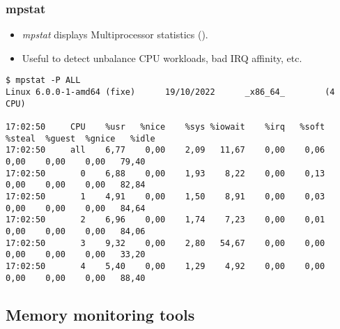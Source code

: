 \begin{frame}[fragile]
  \frametitle{mpstat}
  \begin{itemize}
    \item {\em mpstat} displays Multiprocessor statistics ().
    \item Useful to detect unbalance CPU workloads, bad IRQ affinity, etc.
  \end{itemize}
  \begin{block}{}
    \begin{verbatim}
$ mpstat -P ALL 
Linux 6.0.0-1-amd64 (fixe)      19/10/2022      _x86_64_        (4 CPU)

17:02:50     CPU    %usr   %nice    %sys %iowait    %irq   %soft  %steal  %guest  %gnice   %idle
17:02:50     all    6,77    0,00    2,09   11,67    0,00    0,06    0,00    0,00    0,00   79,40
17:02:50       0    6,88    0,00    1,93    8,22    0,00    0,13    0,00    0,00    0,00   82,84
17:02:50       1    4,91    0,00    1,50    8,91    0,00    0,03    0,00    0,00    0,00   84,64
17:02:50       2    6,96    0,00    1,74    7,23    0,00    0,01    0,00    0,00    0,00   84,06
17:02:50       3    9,32    0,00    2,80   54,67    0,00    0,00    0,00    0,00    0,00   33,20
17:02:50       4    5,40    0,00    1,29    4,92    0,00    0,00    0,00    0,00    0,00   88,40
    \end{verbatim}
  \end{block}
\end{frame}

\subsection{Memory monitoring tools}


